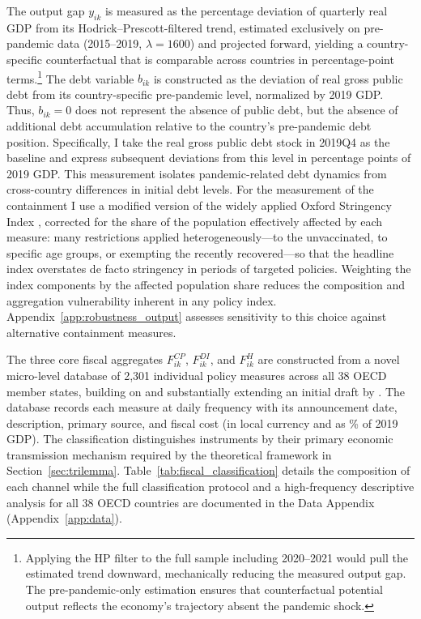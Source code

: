 \documentclass[12pt, a4paper]{article}
\begin{document}

\noindent The output gap $y_{ik}$ is measured as the percentage deviation of quarterly real GDP from its Hodrick--Prescott-filtered trend, estimated exclusively on pre-pandemic data (2015--2019, $\lambda = 1600$) and projected forward, yielding a country-specific counterfactual that is comparable across countries in percentage-point terms.\footnote{Applying the HP filter to the full sample including 2020--2021 would pull the estimated trend downward, mechanically reducing the measured output gap. The pre-pandemic-only estimation ensures that counterfactual potential output reflects the economy's trajectory absent the pandemic shock.} The debt variable \(b_{ik}\) is constructed as the deviation of real gross public debt from its country-specific pre-pandemic level, normalized by 2019 GDP. Thus, \(b_{ik}=0\) does not represent the absence of public debt, but the absence of additional debt accumulation relative to the country's pre-pandemic debt position. Specifically, I take the real gross public debt stock in 2019Q4 as the baseline and express subsequent deviations from this level in percentage points of 2019 GDP. This measurement isolates pandemic-related debt dynamics from cross-country differences in initial debt levels. For the measurement of the containment I use a modified version of the widely applied Oxford Stringency Index \citep{Hale2021}, corrected for the share of the population
effectively affected by each measure: many restrictions applied heterogeneously---to the unvaccinated, to specific age groups, or exempting the recently recovered---so that the headline index overstates de facto stringency in periods of targeted policies. Weighting the index components
by the affected population share reduces the composition and aggregation vulnerability inherent in any policy index. Appendix~\ref{app:robustness_output} assesses sensitivity to this choice against alternative containment measures. 

The three core fiscal aggregates $F_{ik}^{CP}$, $F_{ik}^{DI}$, and $F_{ik}^{H}$ are constructed from a novel micro-level database of 2,301 individual policy measures across all 38 OECD member states, building on and substantially extending an initial draft by \citet{lacey2021}. The database records each measure at daily frequency with its announcement date, description, primary source, and fiscal cost (in local currency and as \% of 2019 GDP). The classification distinguishes instruments by their primary economic transmission mechanism required by the theoretical framework in Section~\ref{sec:trilemma}. Table~\ref{tab:fiscal_classification} details the composition of each channel while the full classification protocol and a high-frequency descriptive analysis for all 38 OECD countries are documented in the Data Appendix (Appendix~\ref{app:data}).
\end{document}
